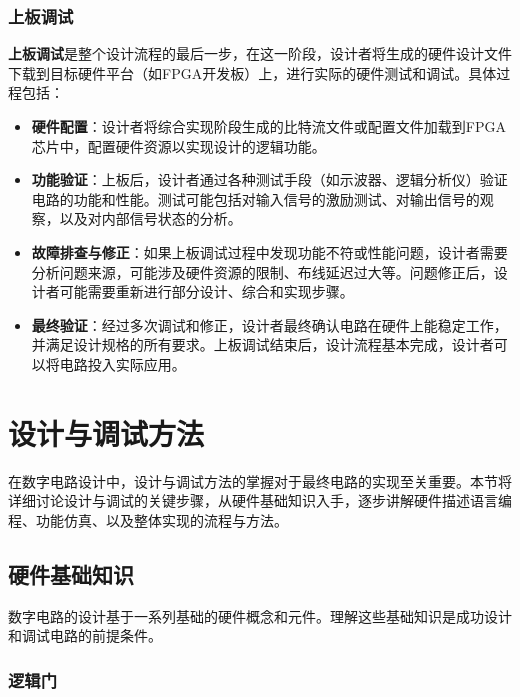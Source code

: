 \subsubsection{上板调试}\label{sec:03-digital-logic-010}

\textbf{上板调试}是整个设计流程的最后一步，在这一阶段，设计者将生成的硬件设计文件下载到目标硬件平台（如FPGA开发板）上，进行实际的硬件测试和调试。具体过程包括：

\begin{itemize}
\tightlist
\item
  \textbf{硬件配置}：设计者将综合实现阶段生成的比特流文件或配置文件加载到FPGA芯片中，配置硬件资源以实现设计的逻辑功能。
\item
  \textbf{功能验证}：上板后，设计者通过各种测试手段（如示波器、逻辑分析仪）验证电路的功能和性能。测试可能包括对输入信号的激励测试、对输出信号的观察，以及对内部信号状态的分析。
\item
  \textbf{故障排查与修正}：如果上板调试过程中发现功能不符或性能问题，设计者需要分析问题来源，可能涉及硬件资源的限制、布线延迟过大等。问题修正后，设计者可能需要重新进行部分设计、综合和实现步骤。
\item
  \textbf{最终验证}：经过多次调试和修正，设计者最终确认电路在硬件上能稳定工作，并满足设计规格的所有要求。上板调试结束后，设计流程基本完成，设计者可以将电路投入实际应用。
\end{itemize}

\section{设计与调试方法}\label{sec:03-digital-logic-011}

在数字电路设计中，设计与调试方法的掌握对于最终电路的实现至关重要。本节将详细讨论设计与调试的关键步骤，从硬件基础知识入手，逐步讲解硬件描述语言编程、功能仿真、以及整体实现的流程与方法。

\subsection{硬件基础知识}\label{sec:03-digital-logic-012}

数字电路的设计基于一系列基础的硬件概念和元件。理解这些基础知识是成功设计和调试电路的前提条件。

\subsubsection{逻辑门}\label{sec:03-digital-logic-013}

